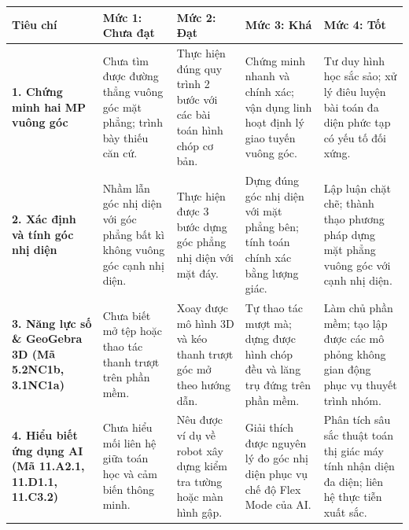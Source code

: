 \documentclass[12pt, a4paper]{article}
\begin{document}
\begin{center}
\begin{tabularx}{\textwidth}{|p{2.8cm}|X|X|X|X|}
    \hline
    \textbf{Tiêu chí} & \textbf{Mức 1: Chưa đạt} & \textbf{Mức 2: Đạt} & \textbf{Mức 3: Khá} & \textbf{Mức 4: Tốt} \\ \hline
    \textbf{1. Chứng minh hai MP vuông góc} & Chưa tìm được đường thẳng vuông góc mặt phẳng; trình bày thiếu căn cứ. & Thực hiện đúng quy trình 2 bước với các bài toán hình chóp cơ bản. & Chứng minh nhanh và chính xác; vận dụng linh hoạt định lý giao tuyến vuông góc. & Tư duy hình học sắc sảo; xử lý điêu luyện bài toán đa diện phức tạp có yếu tố đối xứng. \\ \hline
    \textbf{2. Xác định và tính góc nhị diện} & Nhầm lẫn góc nhị diện với góc phẳng bất kì không vuông góc cạnh nhị diện. & Thực hiện được 3 bước dựng góc phẳng nhị diện với mặt đáy. & Dựng đúng góc nhị diện với mặt phẳng bên; tính toán chính xác bằng lượng giác. & Lập luận chặt chẽ; thành thạo phương pháp dựng mặt phẳng vuông góc với cạnh nhị diện. \\ \hline
    \textbf{3. Năng lực số \& GeoGebra 3D (Mã 5.2NC1b, 3.1NC1a)} & Chưa biết mở tệp hoặc thao tác thanh trượt trên phần mềm. & Xoay được mô hình 3D và kéo thanh trượt góc mở theo hướng dẫn. & Tự thao tác mượt mà; dựng được hình chóp đều và lăng trụ đứng trên phần mềm. & Làm chủ phần mềm; tạo lập được các mô phỏng không gian động phục vụ thuyết trình nhóm. \\ \hline
    \textbf{4. Hiểu biết ứng dụng AI (Mã 11.A2.1, 11.D1.1, 11.C3.2)} & Chưa hiểu mối liên hệ giữa toán học và cảm biến thông minh. & Nêu được ví dụ về robot xây dựng kiểm tra tường hoặc màn hình gập. & Giải thích được nguyên lý đo góc nhị diện phục vụ chế độ Flex Mode của AI. & Phân tích sâu sắc thuật toán thị giác máy tính nhận diện đa diện; liên hệ thực tiễn xuất sắc. \\ \hline
\end{tabularx}
\end{center}
\end{document}
